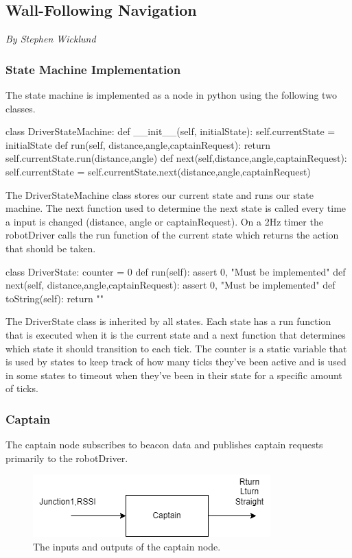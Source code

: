 \documentclass[12pt]{report}
\newcommand{\sectionAuthor}[1]{{\small\vspace{-1em}\textit{#1}}\bigskip\par}
\begin{document}
\subsection{Wall-Following Navigation}
\sectionAuthor{By Stephen Wicklund}
\subsubsection{State Machine Implementation }
The state machine is implemented as a node in python using the following two classes.

\begin{python}
class DriverStateMachine:
    def __init__(self, initialState):
        self.currentState = initialState
    def run(self, distance,angle,captainRequest):
        return self.currentState.run(distance,angle)
    def next(self,distance,angle,captainRequest):
        self.currentState = self.currentState.next(distance,angle,captainRequest)
\end{python}
The DriverStateMachine class stores our current state and runs our state machine. The next function used to determine the next state is called every time a input is changed (distance, angle or captainRequest). On a 2Hz timer the robotDriver calls the run function of the current state which returns the action that should be taken.

\begin{python}
class DriverState:
    counter = 0
    def run(self):
        assert 0, "Must be implemented"
    def next(self, distance,angle,captainRequest):
        assert 0, "Must be implemented"
    def toString(self):
        return ""
\end{python}

The DriverState class is inherited by all states. Each state has a run function that is executed when it is the current state and a next function that determines which state it should transition to each tick. The counter is a static variable that is used by states to keep track of how many ticks they've been active and is used in some states to timeout when they've been in their state for a specific amount of ticks.



\subsubsection{Captain}
The captain node subscribes to beacon data and publishes captain requests primarily to the robotDriver.
\begin{figure}[H]
    \centering
    \includegraphics[scale=0.75]{images/CaptainCloseUp.drawio.png}
    \caption{The inputs and outputs of the captain node.}
    \label{Captain Node Closeup}
\end{figure}
\end{document}
